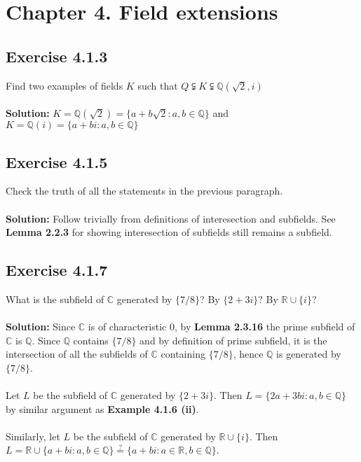 \documentclass{article}
\begin{document}
\section*{Chapter 4. Field extensions}

\subsection*{Exercise 4.1.3}
Find two examples of fields $K$ such that $Q \subsetneqq K \subsetneqq \mathbb{Q}(\sqrt2, i)$ 
\\\\
\textbf{Solution:} $K=\mathbb{Q}(\sqrt2) = \{a+b\sqrt2: a,b \in \mathbb{Q}\}$ and \\ $K=\mathbb{Q}(i)= \{a+bi: a,b \in \mathbb{Q}\}$

\subsection*{Exercise 4.1.5}
Check the truth of all the statements in the previous paragraph.
\\\\
\textbf{Solution:} Follow trivially from definitions of interesection and subfields. See \textbf{Lemma 2.2.3} for showing interesection of subfields still remains a subfield.

\subsection*{Exercise 4.1.7}
What is the subfield of $\mathbb{C}$ generated by $\{7/8\}$? By $\{2+3i\}$? By $\mathbb{R}\cup\{i\}$?
\\\\
\textbf{Solution:}
Since $\mathbb{C}$ is of characteristic $0$, by \textbf{Lemma 2.3.16} the prime subfield of $\mathbb{C}$ is $\mathbb{Q}$.
Since $\mathbb{Q}$ contains $\{7/8\}$ and by definition of prime subfield, it is the intersection of all the subfields of $\mathbb{C}$ containing $\{7/8\}$, 
hence $\mathbb{Q}$ is generated by $\{7/8\}$.\\\\
Let $L$ be the subfield of $\mathbb{C}$ generated by $\{2+3i\}$. Then $L = \{2a+3bi: a,b \in \mathbb{Q}\}$ by similar argument as \textbf{Example 4.1.6 (ii)}.\\\\
Similarly, let $L$ be the subfield of $\mathbb{C}$ generated by $ \mathbb{R}\cup\{i\}$. Then \\ $L=\mathbb{R} \cup \{a+bi: a,b \in \mathbb{Q}\} \stackrel{?}{=} \{a+bi: a \in \mathbb{R}, b \in \mathbb{Q}\}$.
\end{document}
